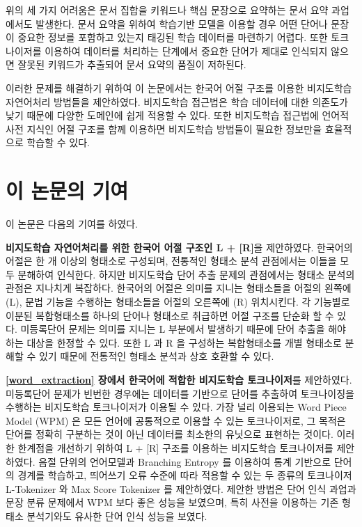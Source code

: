 \documentclass[oneside, ko,phd]{snuthesis_utf8_kor}
\begin{document}
위의 세 가지 어려움은 문서 집합을 키워드나 핵심 문장으로 요약하는 문서 요약 과업에서도 발생한다.
문서 요약을 위하여 학습기반 모델을 이용할 경우 어떤 단어나 문장이 중요한 정보를 포함하고 있는지 태깅된 학습 데이터를 마련하기 어렵다.
또한 토크나이저를 이용하여 데이터를 처리하는 단계에서 중요한 단어가 제대로 인식되지 않으면 잘못된 키워드가 추출되어 문서 요약의 품질이 저하된다.

이러한 문제를 해결하기 위하여 이 논문에서는 한국어 어절 구조를 이용한 비지도학습 자연어처리 방법들을 제안하였다.
비지도학습 접근법은 학습 데이터에 대한 의존도가 낮기 때문에 다양한 도메인에 쉽게 적용할 수 있다.
또한 비지도학습 접근법에 언어적 사전 지식인 어절 구조를 함께 이용하면 비지도학습 방법들이 필요한 정보만을 효율적으로 학습할 수 있다.

\section{이 논문의 기여}
이 논문은 다음의 기여를 하였다.

\textbf{비지도학습 자연어처리를 위한 한국어 어절 구조인 L + [R]}을 제안하였다.
한국어의 어절은 한 개 이상의 형태소로 구성되며, 전통적인 형태소 분석 관점에서는 이들을 모두 분해하여 인식한다.
하지만 비지도학습 단어 추출 문제의 관점에서는 형태소 분석의 관점은 지나치게 복잡하다.
한국어의 어절은 의미를 지니는 형태소들을 어절의 왼쪽에 (L), 문법 기능을 수행하는 형태소들을 어절의 오른쪽에 (R) 위치시킨다.
각 기능별로 이분된 복합형태소를 하나의 단어나 형태소로 취급하면 어절 구조를 단순화 할 수 있다.
미등록단어 문제는 의미를 지니는 L 부분에서 발생하기 때문에 단어 추출을 해야 하는 대상을 한정할 수 있다.
또한 L 과 R 을 구성하는 복합형태소를 개별 형태소로 분해할 수 있기 때문에 전통적인 형태소 분석과 상호 호환할 수 있다.

\textbf{\ref{word_extraction} 장에서 한국어에 적합한 비지도학습 토크나이저}를 제안하였다.
미등록단어 문제가 빈번한 경우에는 데이터를 기반으로 단어를 추출하여 토크나이징을 수행하는 비지도학습 토크나이저가 이용될 수 있다.
가장 널리 이용되는 Word Piece Model (WPM) 은 모든 언어에 공통적으로 이용할 수 있는 토크나이저로, 그 목적은 단어를 정확히 구분하는 것이 아닌 데이터를 최소한의 유닛으로 표현하는 것이다.
이러한 한계점을 개선하기 위하여 L + [R] 구조를 이용하는 비지도학습 토크나이저를 제안하였다.
음절 단위의 언어모델과 Branching Entropy 를 이용하여 통계 기반으로 단어의 경계를 학습하고, 띄어쓰기 오류 수준에 따라 적용할 수 있는 두 종류의 토크나이저 L-Tokenizer 와 Max Score Tokenizer 를 제안하였다.
제안한 방법은 단어 인식 과업과 문장 분류 문제에서 WPM 보다 좋은 성능을 보였으며, 특히 사전을 이용하는 기존 형태소 분석기와도 유사한 단어 인식 성능을 보였다.
\end{document}
